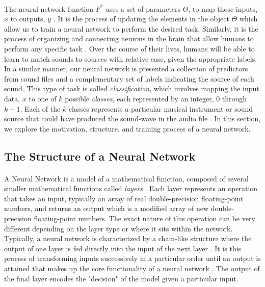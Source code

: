 \documentclass[12pt,letterpaper]{article}
\begin{document}
\paragraph*{}The neural network function $F^*$ uses a set of parameters $\Theta$, to map those inputs, $x$ to outputs, $y$ \cite{Goodfellow,James,Virtanen}. It is the process of updating the elements in the object $\Theta$ which allow us to train a neural network to perform the desired task. Similarly, it is the process of organizing and connecting neurons in the brain that allow humans to perform any specific task \cite{Geron,Levine}. Over the course of their lives, humans will be able to learn to match sounds to sources with relative ease, given the appropriate labels. In a similar manner, our neural network is presented a collection of predictors from sound files and a complementary set of labels indicating the source of each sound. This type of task is called \textit{classification}, which involves mapping the input data, $x$ to one of $k$ possible \textit{classes}, each represented by an integer, $0$ through $k-1$. Each of the $k$ classes represents a particular musical instrument or sound source that could have produced the sound-wave in the audio file \cite{Goodfellow,Loy,Virtanen}. In this section, we explore the motivation, structure, and training process of a neural network.


\subsection{The Structure of a Neural Network}
\label{subsec-NetworkStructure}

\paragraph*{}A Neural Network is a model of a mathematical function, composed of several smaller mathematical functions called \textit{layers} \cite{Goodfellow,Loy}. Each layer represents an operation that takes an input, typically an array of real double-precision floating-point numbers, and returns an output which is a modified array of new double-precision floating-point numbers. The exact nature of this operation can be very different depending on the layer type or where it sits within the network. Typically, a neural network is characterized by a chain-like structure where the output of one layer is fed directly into the input of the next layer \cite{Geron,Goodfellow}. It is this process of transforming inputs successively in a particular order until an output is attained that makes up the core functionality of a neural network \cite{Geron,Loy}. The output of the final layer encodes the "decision" of the model given a particular input.
\end{document}
